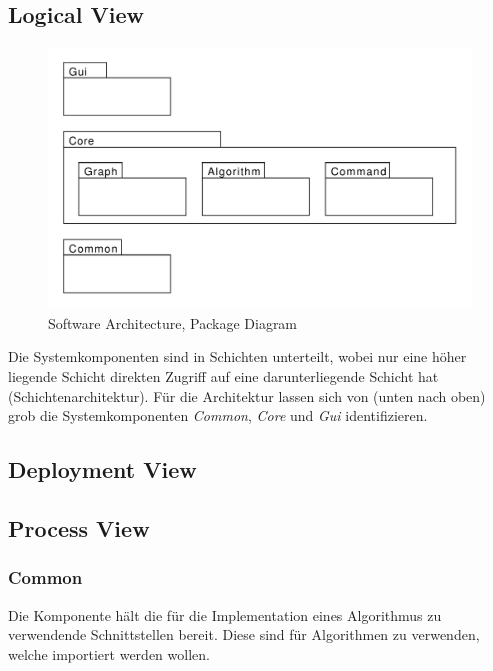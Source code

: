\subsection{Logical View}
\begin{figure}[H]
    \centering
    \includegraphics[scale=0.5]{diagrams/package-diagram.pdf}
    \caption{Software Architecture, Package Diagram}
    \label{fig:package-diagram}
\end{figure}
Die Systemkomponenten sind in Schichten unterteilt, wobei nur eine h\"oher liegende Schicht direkten Zugriff auf eine darunterliegende Schicht hat (Schichtenarchitektur). F\"ur die Architektur lassen sich von (unten nach oben) grob die Systemkomponenten \textit{Common}, \textit{Core} und \textit{Gui} identifizieren.
% 
\subsection{Deployment View}

% 
\subsection{Process View}
% 
\subsubsection{Common}
\label{subsubsec:Common}
Die Komponente h\"alt die f\"ur die Implementation eines Algorithmus zu verwendende Schnittstellen bereit. Diese sind f\"ur Algorithmen zu verwenden, welche importiert werden wollen.
% 
